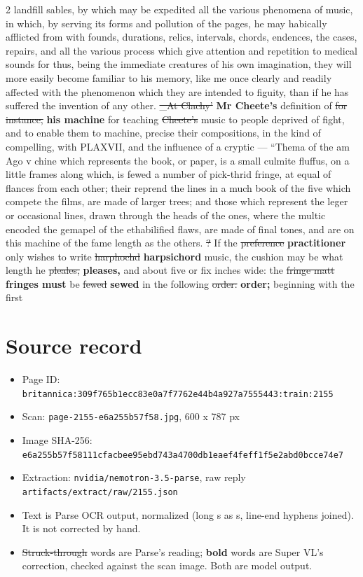 \documentclass[10pt]{article}
\begin{document}
\begin{multicols}{2}
landfill sables, by which may be expedited all the various phenomena of music, in which, by serving its forms and pollution of the pages, he may habically afflicted from with founds, durations, relics, intervals, chords, endences, the cases, repairs, and all the various process which give attention and repetition to medical sounds for thus, being the immediate creatures of his own imagination, they will more easily become familiar to his memory, like me once clearly and readily affected with the phenomenon which they are intended to figuity, than if he has suffered the invention of any other. \sout{\_At Clachy’} \textbf{Mr Cheete's} definition of \sout{for instance,} \textbf{his machine} for teaching \sout{Cheete's} music to people deprived of fight, and to enable them to machine, precise their compositions, in the kind of compelling, with PLAXVII, and the influence of a cryptic — “Thema of the am Ago v chine which represents the book, or paper, is a small culmite fluffus, on a little frames along which, is fewed a number of pick-thrid fringe, at equal of flances from each other; their reprend the lines in a much book of the five which compete the films, are made of larger trees; and those which represent the leger or occasional lines, drawn through the heads of the ones, where the multic encoded the gemapel of the ethabilified flaws, are made of final tones, and are on this machine of the fame length as the others. \sout{?} If the \sout{preference} \textbf{practitioner} only wishes to write \sout{harphochd} \textbf{harpsichord} music, the cushion may be what length he \sout{pleales,} \textbf{pleases,} and about five or fix inches wide: the \sout{fringe matt} \textbf{fringes must} be \sout{fewed} \textbf{sewed} in the following \sout{order:} \textbf{order;} beginning with the first
\end{multicols}
\section*{Source record}
\begin{itemize}
\item Page ID: \texttt{britannica:309f765b1ecc83e0a7f7762e44b4a927a7555443:train:2155}
\item Scan: \texttt{page-2155-e6a255b57f58.jpg}, 600 x 787 px
\item Image SHA-256: \texttt{\small e6a255b57f58111cfacbee95ebd743a4700db1eaef4feff1f5e2abd0bcce74e7}
\item Extraction: \texttt{nvidia/nemotron-3.5-parse}, raw reply \texttt{artifacts/extract/raw/2155.json}
\item Text is Parse OCR output, normalized (long s as s, line-end hyphens joined). It is not corrected by hand.
\item \sout{Struck-through} words are Parse's reading; \textbf{bold} words are Super VL's correction, checked against the scan image. Both are model output.
\end{itemize}
\end{document}
